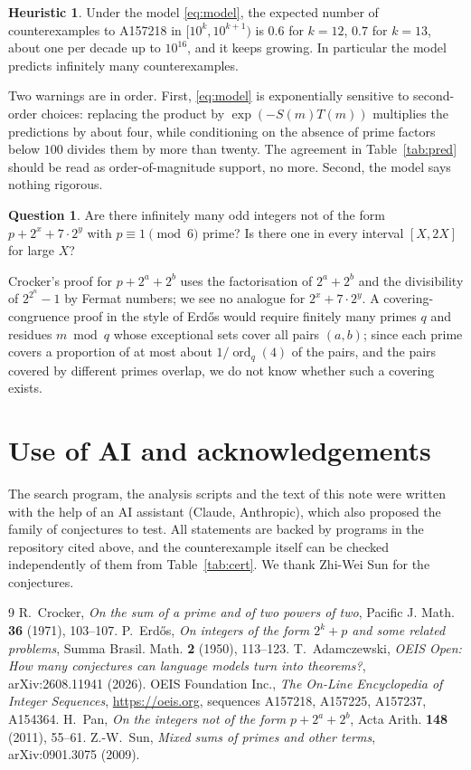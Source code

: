 \documentclass[11pt]{article}
\theoremstyle{definition}
\newtheorem{heuristic}[theorem]{Heuristic}
\newtheorem{question}[theorem]{Question}
\theoremstyle{remark}
\newcommand{\ord}{\operatorname{ord}}
\begin{document}
\begin{heuristic}\label{heur}
Under the model \eqref{eq:model}, the expected number of counterexamples to A157218 in
$[10^{k},10^{k+1})$ is $0.6$ for $k=12$, $0.7$ for $k=13$, about one per decade up to $10^{16}$,
and it keeps growing. In particular the model predicts infinitely many counterexamples.
\end{heuristic}

Two warnings are in order. First, \eqref{eq:model} is exponentially sensitive to second-order
choices: replacing the product by $\exp(-S(m)T(m))$ multiplies the predictions by about four, while
conditioning on the absence of prime factors below $100$ divides them by more than twenty. The
agreement in Table~\ref{tab:pred} should be read as order-of-magnitude support, no more. Second,
the model says nothing rigorous.

\begin{question}
Are there infinitely many odd integers not of the form $p+2^x+7\cdot 2^y$ with $p\equiv 1 \pmod 6$
prime? Is there one in every interval $[X,2X]$ for large $X$?
\end{question}

Crocker's proof for $p+2^a+2^b$ uses the factorisation of $2^a+2^b$ and the divisibility of
$2^{2^n}-1$ by Fermat numbers; we see no analogue for $2^x+7\cdot 2^y$. A covering-congruence proof
in the style of Erd\H{o}s would require finitely many primes $q$ and residues $m \bmod q$ whose
exceptional sets cover all pairs $(a,b)$; since each prime covers a proportion of at most about
$1/\ord_q(4)$ of the pairs, and the pairs covered by different primes overlap, we do not know
whether such a covering exists.

\section*{Use of AI and acknowledgements}
The search program, the analysis scripts and the text of this note were written with the help of
an AI assistant (Claude, Anthropic), which also proposed the family of conjectures to test. All
statements are backed by programs in the repository cited above, and the counterexample itself can
be checked independently of them from Table~\ref{tab:cert}. We thank Zhi-Wei Sun for the
conjectures.

\begin{thebibliography}{9}
 R.~Crocker, \emph{On the sum of a prime and of two powers of two}, Pacific J. Math.
\textbf{36} (1971), 103--107.
 P.~Erd\H{o}s, \emph{On integers of the form $2^k+p$ and some related problems},
Summa Brasil. Math. \textbf{2} (1950), 113--123.
 T.~Adamczewski, \emph{OEIS Open: How many conjectures can language models turn into
theorems?}, arXiv:2608.11941 (2026).
 OEIS Foundation Inc., \emph{The On-Line Encyclopedia of Integer Sequences},
\url{https://oeis.org}, sequences A157218, A157225, A157237, A154364.
 H.~Pan, \emph{On the integers not of the form $p+2^a+2^b$}, Acta Arith. \textbf{148}
(2011), 55--61.
 Z.-W.~Sun, \emph{Mixed sums of primes and other terms}, arXiv:0901.3075 (2009).
\end{thebibliography}
\end{document}
